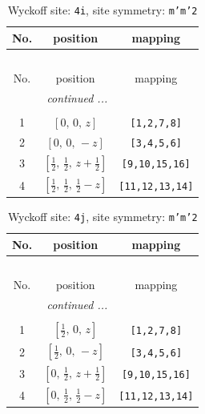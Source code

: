 \documentclass[fleqn,8pt]{jsarticle}
\begin{document}
\renewcommand{\arraystretch}{1.2}
\begin{longtable}{ccc}
\caption{Wyckoff site: {\tt 4i}, site symmetry: {\tt m'm'2}}
 \\
 \hline \hline
No. & position & mapping \\ \hline \endfirsthead

\multicolumn{2}{l}{\tablename\ \thetable{}} \\
 \hline \hline
No. & position & mapping \\ \hline \endhead

 \hline \hline
\multicolumn{2}{r}{\footnotesize\it continued ...} \\ \endfoot

 \hline \hline
\multicolumn{2}{r}{} \\ \endlastfoot

1 & $\left[ 0,\, 0,\, z \right]$ & {\tt [1,2,7,8]} \\ \hline
2 & $\left[ 0,\, 0,\, - z \right]$ & {\tt [3,4,5,6]} \\ \hline
3 & $\left[ \frac{1}{2},\, \frac{1}{2},\, z + \frac{1}{2} \right]$ & {\tt [9,10,15,16]} \\ \hline
4 & $\left[ \frac{1}{2},\, \frac{1}{2},\, \frac{1}{2} - z \right]$ & {\tt [11,12,13,14]} \\
\end{longtable}
\renewcommand{\arraystretch}{1.2}
\begin{longtable}{ccc}
\caption{Wyckoff site: {\tt 4j}, site symmetry: {\tt m'm'2}}
 \\
 \hline \hline
No. & position & mapping \\ \hline \endfirsthead

\multicolumn{2}{l}{\tablename\ \thetable{}} \\
 \hline \hline
No. & position & mapping \\ \hline \endhead

 \hline \hline
\multicolumn{2}{r}{\footnotesize\it continued ...} \\ \endfoot

 \hline \hline
\multicolumn{2}{r}{} \\ \endlastfoot

1 & $\left[ \frac{1}{2},\, 0,\, z \right]$ & {\tt [1,2,7,8]} \\ \hline
2 & $\left[ \frac{1}{2},\, 0,\, - z \right]$ & {\tt [3,4,5,6]} \\ \hline
3 & $\left[ 0,\, \frac{1}{2},\, z + \frac{1}{2} \right]$ & {\tt [9,10,15,16]} \\ \hline
4 & $\left[ 0,\, \frac{1}{2},\, \frac{1}{2} - z \right]$ & {\tt [11,12,13,14]} \\
\end{longtable}
\end{document}
